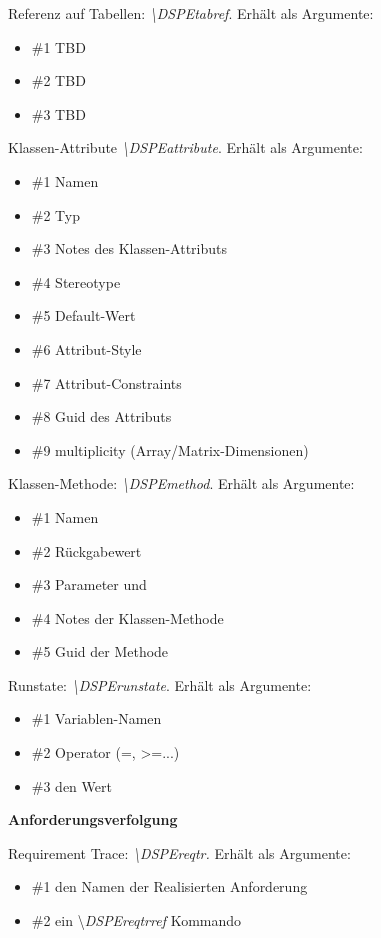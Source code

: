 {Referenz auf Tabellen: \textit{\textbackslash{}DSPEtabref}. Erhält als Argumente:
\begin{itemize}
	\item \#1 TBD
	\item \#2 TBD
	\item \#3 TBD
\end{itemize}

Klassen-Attribute \textit{\textbackslash{}DSPEattribute}. Erhält als Argumente:
\begin{itemize}
	\item \#1 Namen
	\item \#2 Typ
	\item \#3 Notes des Klassen-Attributs
	\item \#4 Stereotype
	\item \#5 Default-Wert
	\item \#6 Attribut-Style
	\item \#7 Attribut-Constraints
	\item \#8 Guid des Attributs
	\item \#9 multiplicity (Array/Matrix-Dimensionen)
\end{itemize}

Klassen-Methode: \textit{\textbackslash{}DSPEmethod}. Erhält als Argumente:
\begin{itemize}
	\item \#1 Namen
	\item \#2  Rückgabewert
	\item \#3 Parameter und
	\item \#4 Notes der Klassen-Methode
	\item \#5 Guid der Methode
\end{itemize}

Runstate: \textit{\textbackslash{}DSPErunstate}. Erhält als Argumente:
\begin{itemize}
	\item \#1 Variablen-Namen
	\item \#2 Operator (=, \textgreater{}=...)
	\item \#3 den Wert
\end{itemize}


\textbf{Anforderungsverfolgung}

Requirement Trace: \textit{\textbackslash{}DSPEreqtr. }Erhält als Argumente:
\begin{itemize}
	\item \#1 den Namen der Realisierten Anforderung
	\item \#2 ein \textbackslash{}\textit{DSPEreqtrref} Kommando
\end{itemize}

}
